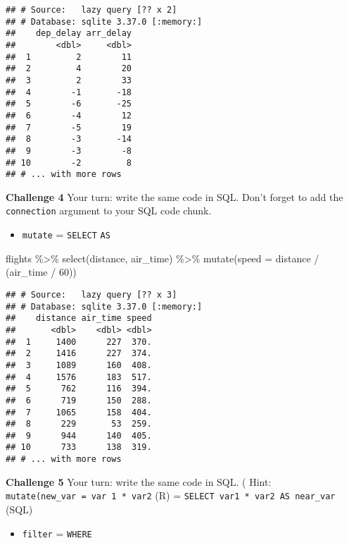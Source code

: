\documentclass[
]{book}
\newenvironment{Shaded}{\begin{snugshade}}{\end{snugshade}}
\newcommand{\AttributeTok}[1]{\textcolor[rgb]{0.77,0.63,0.00}{#1}}
\newcommand{\DecValTok}[1]{\textcolor[rgb]{0.00,0.00,0.81}{#1}}
\newcommand{\FunctionTok}[1]{\textcolor[rgb]{0.00,0.00,0.00}{#1}}
\newcommand{\NormalTok}[1]{#1}
\newcommand{\SpecialCharTok}[1]{\textcolor[rgb]{0.00,0.00,0.00}{#1}}
\providecommand{\tightlist}{%
  \setlength{\itemsep}{0pt}\setlength{\parskip}{0pt}}
\begin{document}
\begin{verbatim}
## # Source:   lazy query [?? x 2]
## # Database: sqlite 3.37.0 [:memory:]
##    dep_delay arr_delay
##        <dbl>     <dbl>
##  1         2        11
##  2         4        20
##  3         2        33
##  4        -1       -18
##  5        -6       -25
##  6        -4        12
##  7        -5        19
##  8        -3       -14
##  9        -3        -8
## 10        -2         8
## # ... with more rows
\end{verbatim}

\textbf{Challenge 4}
Your turn: write the same code in SQL. Don't forget to add the \texttt{connection} argument to your SQL code chunk.

\begin{itemize}
\tightlist
\item
  \texttt{mutate} = \texttt{SELECT} \texttt{AS}
\end{itemize}

\begin{Shaded}
\begin{Highlighting}[]
\NormalTok{flights }\SpecialCharTok{\%\textgreater{}\%}
  \FunctionTok{select}\NormalTok{(distance, air\_time) }\SpecialCharTok{\%\textgreater{}\%}  
  \FunctionTok{mutate}\NormalTok{(}\AttributeTok{speed =}\NormalTok{ distance }\SpecialCharTok{/}\NormalTok{ (air\_time }\SpecialCharTok{/} \DecValTok{60}\NormalTok{)) }
\end{Highlighting}
\end{Shaded}

\begin{verbatim}
## # Source:   lazy query [?? x 3]
## # Database: sqlite 3.37.0 [:memory:]
##    distance air_time speed
##       <dbl>    <dbl> <dbl>
##  1     1400      227  370.
##  2     1416      227  374.
##  3     1089      160  408.
##  4     1576      183  517.
##  5      762      116  394.
##  6      719      150  288.
##  7     1065      158  404.
##  8      229       53  259.
##  9      944      140  405.
## 10      733      138  319.
## # ... with more rows
\end{verbatim}

\textbf{Challenge 5}
Your turn: write the same code in SQL. (
Hint: \texttt{mutate(new\_var\ =\ var\ 1\ *\ var2} (R) = \texttt{SELECT\ var1\ *\ var2\ AS\ near\_var} (SQL)

\begin{itemize}
\tightlist
\item
  \texttt{filter} = \texttt{WHERE}
\end{itemize}
\end{document}
